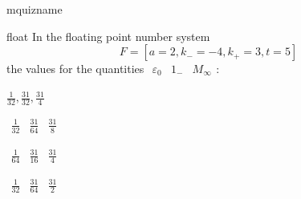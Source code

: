 \documentclass[12pt]{article}
\begin{document}
\begin{quiz}{mquizname}


\begin{multi}{float}
In the floating point number system $$  F=\left[ a=2, k_{-}=-4, k_{+}=3, t=5 \right]  $$ the values for the quantities 
$ {\begin{array}{ccc}\varepsilon_{0}& 1_{-}& M_{\infty}\end{array}} $:
\item* $ \frac{1}{32}, \frac{31}{32}, \frac{31}{4} $
\item  $ {\begin{array}{ccc}\frac{1}{32}& \frac{31}{64}& \frac{31}{8}\end{array}} $
\item  $ {\begin{array}{ccc}\frac{1}{64}& \frac{31}{16}& \frac{31}{4}\end{array}} $
\item  $ {\begin{array}{ccc}\frac{1}{32}& \frac{31}{64}& \frac{31}{2}\end{array}} $
\end{multi}

\end{quiz}
\end{document}
